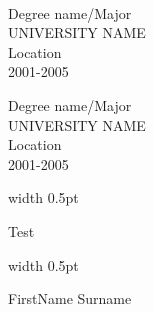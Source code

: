 \documentclass[12pt, a4paper, conference]{IEEEtran}
\newcommand{\borderthickness}{0.5pt}
\begin{document}
\begin{minipage}[t][5cm][t]{0.3\textwidth}
{}\\

\begin{flushright}
Degree name/Major\\
UNIVERSITY NAME\\
Location\\
2001-2005
\end{flushright}


\begin{flushright}
Degree name/Major\\
UNIVERSITY NAME\\
Location\\
2001-2005
\end{flushright}

\end{minipage}
\quad
\textcolor{bordercolour}{\vrule height 3ex width \borderthickness}
\quad
	
\begin{minipage}[t][5cm][t]{0.3\textwidth}
\color{white}Test
\end{minipage}
\quad
\textcolor{bordercolour}{\vrule height 4.32ex width \borderthickness}
\quad

\noindent\makebox[\linewidth]{\textcolor{bordercolour}{\rule{\paperwidth}{\borderthickness}}}

\newpage

\begin{minipage}{\textwidth}
{\fontsize{50}{1}\selectfont FirstName \color{orange}Surname}
\\
\end{minipage}
\noindent\makebox[\linewidth]{\textcolor{bordercolour}{\rule{\paperwidth}{\borderthickness}}}
\end{document}
